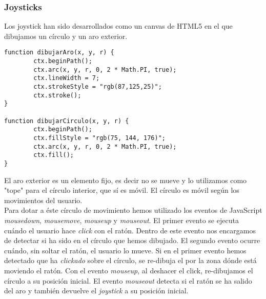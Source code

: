 \subsubsection{Joysticks}

Los joystick han sido desarrollados como un canvas de HTML5 en el que dibujamos un círculo y un aro exterior.\\

\begin{lstlisting}[caption=Aro y círculo del joystick.]
function dibujarAro(x, y, r) {
        ctx.beginPath();
        ctx.arc(x, y, r, 0, 2 * Math.PI, true);
        ctx.lineWidth = 7;
        ctx.strokeStyle = "rgb(87,125,25)";
        ctx.stroke();
}

function dibujarCirculo(x, y, r) {
        ctx.beginPath();
        ctx.fillStyle = "rgb(75, 144, 176)";
        ctx.arc(x, y, r, 0, 2 * Math.PI, true);
        ctx.fill();
}
\end{lstlisting}


El aro exterior es un elemento fijo, es decir no se mueve y lo utilizamos como "tope" para el círculo interior, que sí es móvil. El círculo es móvil según los movimientos del usuario.\\

Para dotar a éste círculo de movimiento hemos utilizado los eventos de JavaScript \emph{mousedown}, \emph{mousemove}, \emph{mouseup} y \emph{mouseout}. El primer evento se ejecuta cuándo el usuario hace \emph{click} con el ratón. Dentro de este evento nos encargamos de detectar si ha sido en el círculo que hemos dibujado. El segundo evento ocurre cuándo, sin soltar el ratón, el usuario lo mueve. Si en el primer evento hemos detectado que ha \emph{clickado} sobre el círculo, se re-dibuja el por la zona dónde está moviendo el ratón. Con el evento \emph{mouseup}, al deshacer el click, re-dibujamos el círculo a su posición inicial. El evento \emph{mouseout} detecta si el ratón se ha salido del aro y también devuelve el \emph{joystick} a su posición inicial.\\


